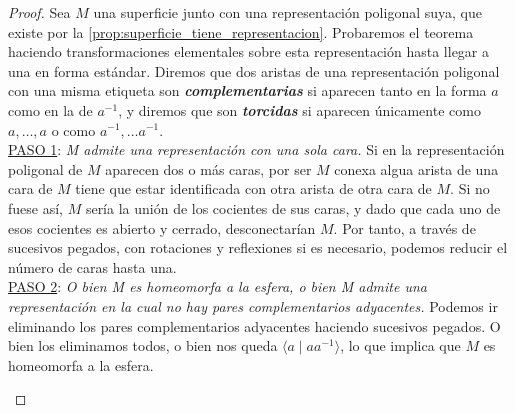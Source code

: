 \documentclass[10pt]{report}
\newcommand{\enfatiza}[1]{\textbf{\textit{#1}}}
\theoremstyle{definition}
\begin{document}
\begin{proof}
Sea $M$ una superficie junto con una representación poligonal suya, que existe por la \autoref{prop:superficie_tiene_representacion}. Probaremos el teorema haciendo transformaciones elementales sobre esta representación hasta llegar a una en forma estándar.
Diremos que dos aristas de una representación poligonal con una misma etiqueta son \enfatiza{complementarias} si aparecen tanto en la forma $a$ como en la de $a^{-1}$, y diremos que son \enfatiza{torcidas} si aparecen únicamente como $a,\dots ,a$ o como $a^{-1},\dots a^{-1}$. \\

\underline{PASO 1}: \textit{M admite una representación con una sola cara.} Si en la representación poligonal de $M$ aparecen dos o más caras, por ser $M$ conexa algua arista de una cara de $M$ tiene que estar identificada con otra arista de otra cara de $M$. Si no fuese así, $M$ sería la unión de los cocientes de sus caras, y dado que cada uno de esos cocientes es abierto y cerrado, desconectarían $M$. Por tanto, a través de sucesivos pegados, con rotaciones y reflexiones si es necesario, podemos reducir el número de caras hasta una.\\

\underline{PASO 2}: \textit{O bien M es homeomorfa a la esfera, o bien M admite una representación en la cual no hay pares complementarios adyacentes.} Podemos ir eliminando los pares complementarios adyacentes haciendo sucesivos pegados. O bien los eliminamos todos, o bien nos queda $\langle a\mid aa^{-1}\rangle$, lo que implica que $M$ es homeomorfa a la esfera.\\

\begin{figure}
\centering
{}
\end{figure}
\end{proof}
\end{document}
